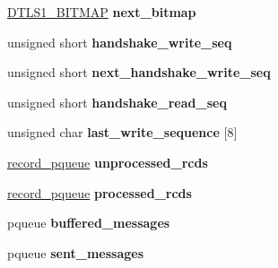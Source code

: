 \begin{DoxyCompactItemize}
\item 
\hypertarget{structdtls1__state__st_a2ef30a3f09e71c8d936db1f4a8a68c10}{}\hyperlink{structdtls1__bitmap__st}{D\+T\+L\+S1\+\_\+\+B\+I\+T\+M\+A\+P} {\bfseries next\+\_\+bitmap}\label{structdtls1__state__st_a2ef30a3f09e71c8d936db1f4a8a68c10}

\item 
\hypertarget{structdtls1__state__st_ac14d838ba2fa596ab378ac07bee6e0c8}{}unsigned short {\bfseries handshake\+\_\+write\+\_\+seq}\label{structdtls1__state__st_ac14d838ba2fa596ab378ac07bee6e0c8}

\item 
\hypertarget{structdtls1__state__st_ae5ce4e4dc2d5625594b6c7a339198a23}{}unsigned short {\bfseries next\+\_\+handshake\+\_\+write\+\_\+seq}\label{structdtls1__state__st_ae5ce4e4dc2d5625594b6c7a339198a23}

\item 
\hypertarget{structdtls1__state__st_a928b4ab02c52ca660cb46762133b21bb}{}unsigned short {\bfseries handshake\+\_\+read\+\_\+seq}\label{structdtls1__state__st_a928b4ab02c52ca660cb46762133b21bb}

\item 
\hypertarget{structdtls1__state__st_aceeaa0dd2d3f7a47a99a85c8db8013ea}{}unsigned char {\bfseries last\+\_\+write\+\_\+sequence} \mbox{[}8\mbox{]}\label{structdtls1__state__st_aceeaa0dd2d3f7a47a99a85c8db8013ea}

\item 
\hypertarget{structdtls1__state__st_ada130633ccbd3372ee777efb93c953a9}{}\hyperlink{structrecord__pqueue__st}{record\+\_\+pqueue} {\bfseries unprocessed\+\_\+rcds}\label{structdtls1__state__st_ada130633ccbd3372ee777efb93c953a9}

\item 
\hypertarget{structdtls1__state__st_ac7496a32427c880c57cad29cf624983b}{}\hyperlink{structrecord__pqueue__st}{record\+\_\+pqueue} {\bfseries processed\+\_\+rcds}\label{structdtls1__state__st_ac7496a32427c880c57cad29cf624983b}

\item 
\hypertarget{structdtls1__state__st_af242d453bd217c772b95c98e8848a8b4}{}pqueue {\bfseries buffered\+\_\+messages}\label{structdtls1__state__st_af242d453bd217c772b95c98e8848a8b4}

\item 
\hypertarget{structdtls1__state__st_a8372fea113b299678228ba73dcd17b03}{}pqueue {\bfseries sent\+\_\+messages}\label{structdtls1__state__st_a8372fea113b299678228ba73dcd17b03}


\end{DoxyCompactItemize}

